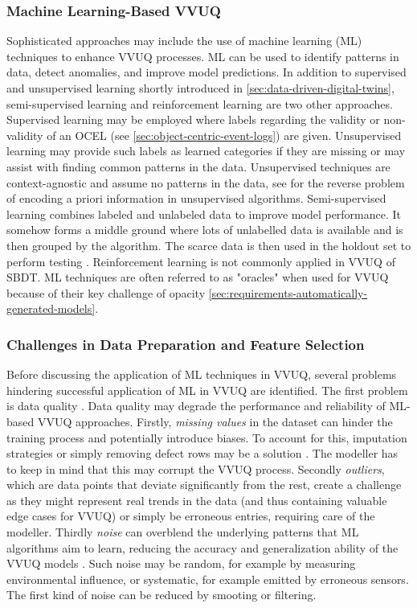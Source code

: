 \subsubsection*{Machine Learning-Based VVUQ}

Sophisticated approaches may include the use of machine learning (ML) techniques to enhance VVUQ processes. ML can be used to identify patterns in data, detect anomalies, and improve model predictions. In addition to supervised and unsupervised learning shortly introduced in \autoref{sec:data-driven-digital-twins}, semi-supervised learning and reinforcement learning are two other approaches. Supervised learning may be employed where labels regarding the validity or non-validity of an OCEL (see \autoref{sec:object-centric-event-logs}) are given. Unsupervised learning may provide such labels as learned categories if they are missing or may assist with finding common patterns in the data. Unsupervised techniques are context-agnostic and assume no patterns in the data, see \citeauthor{hastie2009unsupervised} for the reverse problem of encoding a priori information in unsupervised algorithms. Semi-supervised learning combines labeled and unlabeled data to improve model performance. It somehow forms a middle ground where lots of unlabelled data is available and is then grouped by the algorithm. The scarce data is then used in the holdout set to perform testing \parencite{learning2006semi}. Reinforcement learning is not commonly applied in VVUQ of SBDT.
ML techniques are often referred to as "oracles" when used for VVUQ because of their key challenge of opacity \autoref{sec:requirements-automatically-generated-models}.

\subsubsection*{Challenges in Data Preparation and Feature Selection}

Before discussing the application of ML techniques in VVUQ, several problems hindering successful application of ML in VVUQ are identified. The first problem is data quality \parencite{wu2025uncertainty}. Data quality may degrade the performance and reliability of ML-based VVUQ approaches. Firstly, \textit{missing values} in the dataset can hinder the training process and potentially introduce biases. To account for this, imputation strategies or simply removing defect rows may be a solution \parencite{gudivada2017data}. The modeller has to keep in mind that this may corrupt the VVUQ process. Secondly \textit{outliers}, which are data points that deviate significantly from the rest, create a challenge as they might represent real trends in the data (and thus containing valuable edge cases for VVUQ) or simply be erroneous entries, requiring care of the modeller. Thirdly \textit{noise} can overblend the underlying patterns that ML algorithms aim to learn, reducing the accuracy and generalization ability of the VVUQ models \parencite{liu2020noise}. Such noise may be random, for example by measuring environmental influence, or systematic, for example emitted by erroneous sensors. The first kind of noise can be reduced by smooting or filtering.

